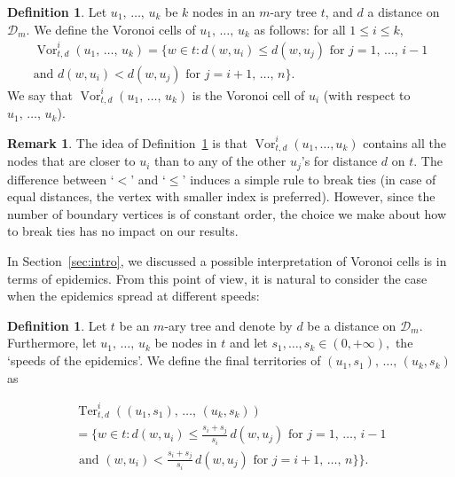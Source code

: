\documentclass[10pt]{amsart}
\theoremstyle{definition}\newtheorem{defi}[theo]{Definition}\newtheorem{rema}[theo]{Remark}\newtheorem{exam}[theo]{Example}\newtheorem{exem}[theo]{Example}\newtheorem{nota}[theo]{Notation}
\newcommand{\Vor}{\operatorname{Vor}}
\newcommand{\Ter}{\operatorname{Ter}}
\newcommand{\clD}{\mathcal{D}}
\begin{document}
\begin{defi}\label{def:Vor}
Let $u_1, \,\ldots,\, u_k$ be $k$ nodes in an $m$-ary tree $t$, and $d$ a distance on $\clD_m$. We define the Voronoi cells of $u_1, \,\ldots,\, u_k$ as follows: for all $1\leq i\leq k$,
\begin{multline*}
\Vor_{t,d}^{i}(u_1, \,\ldots,\, u_k) =\big\{w\in t \colon d(w,u_i)\le d(w,u_j)\text{ for }j=1,\,\dots,\,i-1 \\ \text{and } d(w,u_i)<d(w,u_j)\text{ for }j=i+1,\,\dots,\,n \big \}.
\end{multline*}
We say that $\Vor_{t,d}^i(u_1, \,\ldots,\, u_k)$ is the Voronoi cell of $u_i$ (with respect to $u_1, \,\ldots,\, u_k$).
\end{defi}

\begin{rema}
The idea of Definition~\ref{def:Vor} is that $\Vor_{t,d}^i(u_1, \ldots, u_k)$ contains all the nodes that are closer to $u_i$ than to any of the other $u_j$'s for distance $d$ on $t$. The difference between `$<$' and `$\le$' induces a simple rule to break ties (in case of equal distances, the vertex with smaller index is preferred). However, since the number of boundary vertices is of constant order, the choice we make about how to break ties has no impact on our results.
\end{rema}

In Section~\ref{sec:intro}, we discussed a possible interpretation of Voronoi cells is in terms of epidemics. From this point of view, it is natural to consider the case when the epidemics spread at different speeds:

\begin{defi}
Let $t$ be an $m$-ary tree and denote by $d$ be a distance on $\clD_m.$ Furthermore, let $u_1,\, \ldots,\, u_k$ be nodes in $t$ and let $s_1, \ldots, s_k\in (0,+\infty),$ the \lq speeds of the epidemics\rq. We define the final territories of $(u_1,s_1), \,\ldots,\, (u_k, s_k)$ as

\begin{multline*}
\Ter_{t,d}^i((u_1, s_1), \,\ldots,\, (u_k, s_k))\\
=\Big\{w\in t \colon d(w,u_i) \le \frac{s_i+s_j}{s_i}\,d(w,u_j) \text{ for }j=1,\,\dots,\,i-1 \\
\text{ and }(w,u_i)< \frac{s_i+s_j}{s_i}\,d(w,u_j)
\text{ for }j=i+1,\,\dots,\,n\} \Big\}.
\end{multline*}
\end{defi}
\end{document}
